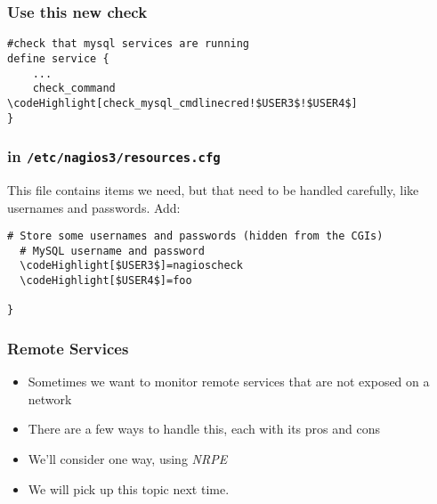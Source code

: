 \documentclass[10pt]{beamer}
\newcommand\codeHighlight[1]{\textcolor[rgb]{1,0,0}{\textbf{#1}}}
\begin{document}
\begin{frame}[fragile]
  \frametitle{Use this new check}


\begin{Verbatim}[commandchars=\\\[\]]
#check that mysql services are running
define service {
	...
    check_command    \codeHighlight[check_mysql_cmdlinecred!$USER3$!$USER4$]
}

\end{Verbatim}
\end{frame}

\begin{frame}[fragile]
  \frametitle{in \texttt{/etc/nagios3/resources.cfg}}

This file contains items we need, but that need to be handled carefully, like
usernames and passwords.  Add:

\begin{Verbatim}[commandchars=\\\[\]]
  # Store some usernames and passwords (hidden from the CGIs)
  # MySQL username and password
  \codeHighlight[$USER3$]=nagioscheck
  \codeHighlight[$USER4$]=foo

}
\end{Verbatim}
\end{frame}

\begin{frame}
  \frametitle{Remote Services}


\begin{itemize}
  \item Sometimes we want to monitor remote services that are not exposed on a network
  \item There are a few ways to handle this, each with its pros and cons
  \item We'll consider one way, using \emph{NRPE}
  \item We will pick up this topic next time.
\end{itemize}

\end{frame}
\end{document}
